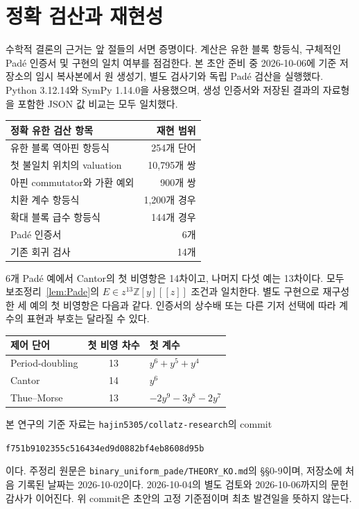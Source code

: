 \documentclass[11pt,a4paper]{article}
\theoremstyle{koreanplain}
\newcommand{\Z}{\mathbb Z}
\newcommand{\repo}{\texttt{hajin5305/collatz-research}}
\begin{document}
\section{정확 검산과 재현성}\label{sec:reproduce}

수학적 결론의 근거는 앞 절들의 서면 증명이다. 계산은 유한 블록 항등식, 구체적인 Padé 인증서 및 구현의 일치 여부를 점검한다. 본 초안 준비 중 2026-10-06에 기준 저장소의 임시 복사본에서 원 생성기, 별도 검사기와 독립 Padé 검산을 실행했다. Python 3.12.14와 SymPy 1.14.0을 사용했으며, 생성 인증서와 저장된 결과의 자료형을 포함한 JSON 값 비교는 모두 일치했다.

\begin{center}
\begin{tabular}{lr}
\toprule
정확 유한 검산 항목 & 재현 범위\\
\midrule
유한 블록 역아핀 항등식 & 254개 단어\\
첫 불일치 위치의 valuation & 10,795개 쌍\\
아핀 commutator와 가환 예외 & 900개 쌍\\
치환 계수 항등식 & 1,200개 경우\\
확대 블록 급수 항등식 & 144개 경우\\
Padé 인증서 & 6개\\
기존 회귀 검사 & 14개\\
\bottomrule
\end{tabular}
\end{center}

6개 Padé 예에서 Cantor의 첫 비영항은 14차이고, 나머지 다섯 예는 13차이다. 모두 보조정리~\ref{lem:Pade}의 $E\in z^{13}\Z[y][[z]]$ 조건과 일치한다. 별도 구현으로 재구성한 세 예의 첫 비영항은 다음과 같다. 인증서의 상수배 또는 다른 기저 선택에 따라 계수의 표현과 부호는 달라질 수 있다.

\begin{center}
\begin{tabular}{lcl}
\toprule
제어 단어 & 첫 비영 차수 & 첫 계수\\
\midrule
Period-doubling & 13 & $y^6+y^5+y^4$\\
Cantor & 14 & $y^6$\\
Thue--Morse & 13 & $-2y^9-3y^8-2y^7$\\
\bottomrule
\end{tabular}
\end{center}

본 연구의 기준 자료는 \repo 의 commit
\begin{center}\small\texttt{f751b9102355c516434ed9d0882bf4eb8608d95b}\end{center}
이다. 주정리 원문은 \texttt{binary\_uniform\_pade/THEORY\_KO.md}의 §§0-9이며, 저장소에 처음 기록된 날짜는 2026-10-02이다. 2026-10-04의 별도 검토와 2026-10-06까지의 문헌 감사가 이어진다. 위 commit은 초안의 고정 기준점이며 최초 발견일을 뜻하지 않는다.
\end{document}
